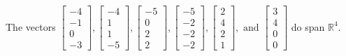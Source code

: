 \begin{exercise}
\begin{exerciseStatement}
  \end{exerciseStatement}
  \begin{exerciseAnswer}
   The vectors \(\left[\begin{array}{r}
-4 \\
-1 \\
0 \\
-3
\end{array}\right] , \left[\begin{array}{r}
-4 \\
1 \\
1 \\
-5
\end{array}\right] , \left[\begin{array}{r}
-5 \\
0 \\
2 \\
2
\end{array}\right] , \left[\begin{array}{r}
-5 \\
-2 \\
-2 \\
-2
\end{array}\right] , \left[\begin{array}{r}
2 \\
4 \\
2 \\
1
\end{array}\right] , \text{ and } \left[\begin{array}{r}
3 \\
4 \\
0 \\
0
\end{array}\right]\) 
  	 do  
	span \(\mathbb{R}^4\).
  


  \end{exerciseAnswer}
\end{exercise}